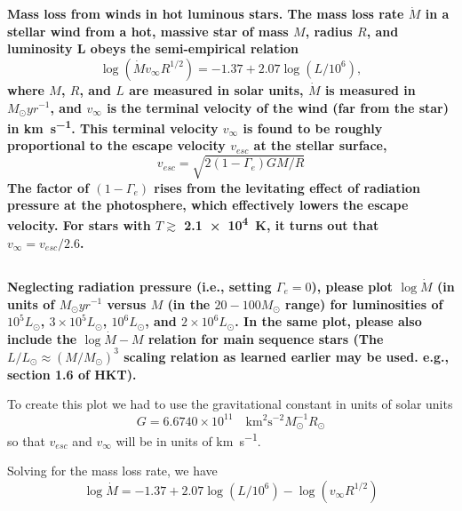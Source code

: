 \section{}
\textbf{Mass loss from winds in hot luminous stars. The mass loss rate $\Dot{M}$ in a stellar wind from a hot, massive star of mass $M$, radius $R$, and luminosity L obeys the semi-empirical relation
\begin{equation}
    \log(\Dot{M}v_\infty R^{1/2}) = -1.37 + 2.07\log(L/10^6),
\end{equation}
where $M$, $R$, and $L$ are measured in solar units, $\Dot{M}$ is measured in $M_\odot yr^{-1}$, and $v_\infty$ is the terminal velocity of the wind (far from the star) in \si{\kilo\meter\per\s}. 
This terminal velocity $v_\infty$ is found to be roughly proportional to the escape velocity $v_{esc}$ at the stellar surface,
\begin{equation}
    v_{esc}= \sqrt{2(1-\Gamma_e)GM/R}
\end{equation}
The factor of $(1-\Gamma_e)$ rises from the levitating effect of radiation pressure at the photosphere, which effectively lowers the escape velocity.
For stars with $T \gtrsim$ \SI{2.1e4}{\kelvin}, it turns out that $v_\infty = v_{esc} /2.6$.}

\subsection{}
\textbf{Neglecting radiation pressure (i.e., setting $\Gamma_e = 0$), please plot $\log\Dot{M}$ (in units of $M_\odot yr^{-1}$ versus $M$ (in the $20-100 M_\odot$ range) for luminosities of $10^5 L_\odot$, $3\times 10^5 L_\odot$, $10^6 L_\odot$, and $2\times 10^6 L_\odot$.
In the same plot, please also include the $\log\Dot{M} - M$ relation for main sequence stars (The $L/L_\odot \approx (M/M_\odot)^3$ scaling relation as learned earlier may be used. e.g., section 1.6 of HKT).}

To create this plot we had to use the gravitational constant in units of solar units
\begin{equation}
    G = 6.6740\times 10^{11}\quad \si{\km^2\s^{-2}}M_\odot^{-1}R_\odot
\end{equation}
so that $v_{esc}$ and $v_\infty$ will be in units of \si{\km\per\s}.

Solving for the mass loss rate, we have
\begin{equation}
    \log\Dot{M} = -1.37 + 2.07\log(L/10^6)-\log(v_\infty R^{1/2})
    \label{eq:massLossRate}
\end{equation}


